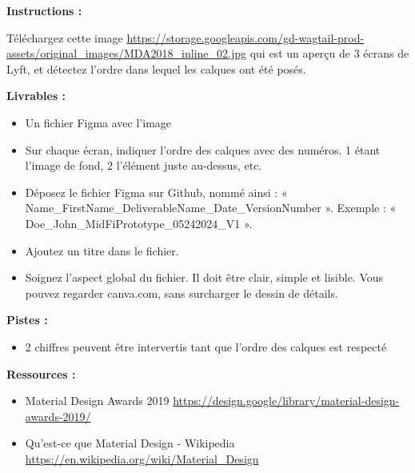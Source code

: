 \makeheaderfiles

\textbf{Instructions :}

Téléchargez cette image \url{https://storage.googleapis.com/gd-wagtail-prod-assets/original_images/MDA2018_inline_02.jpg} qui est un aperçu de 3 écrans de Lyft, et détectez l'ordre dans lequel les calques ont été posés.

\textbf{Livrables :}

\begin{itemize}
\item Un fichier Figma avec l'image
\item Sur chaque écran, indiquer l'ordre des calques avec des numéros. 1 étant l'image de fond, 2 l'élément juste au-dessus, etc.
\item Déposez le fichier Figma sur Github, nommé ainsi : « Name\_FirstName\_DeliverableName\_Date\_VersionNumber ». Exemple : « Doe\_John\_MidFiPrototype\_05242024\_V1 ».
\item Ajoutez un titre dans le fichier.
\item Soignez l'aspect global du fichier. Il doit être clair, simple et lisible. Vous pouvez regarder canva.com, sans surcharger le dessin de détails.
\end{itemize}

\textbf{Pistes :}

\begin{itemize}
\item 2 chiffres peuvent être intervertis tant que l'ordre des calques est respecté
\end{itemize}

\textbf{Ressources :}

\begin{itemize}
\item Material Design Awards 2019 \url{https://design.google/library/material-design-awards-2019/}
\item Qu'est-ce que Material Design - Wikipedia \url{https://en.wikipedia.org/wiki/Material_Design}
\end{itemize}

